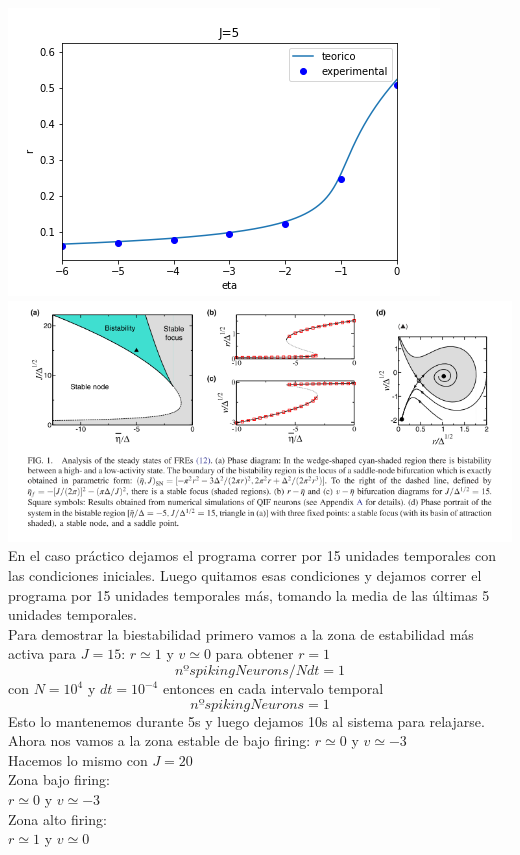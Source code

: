 \documentclass[a4paper]{article}
\begin{document}
\includegraphics[scale=0.7]{r_vs_eta_J5.png}\\
\includegraphics[scale=0.4]{diagramaspaper.png}\\

En el caso práctico dejamos el programa correr por 15 unidades temporales con las condiciones iniciales. Luego quitamos esas condiciones y dejamos correr el programa por 15 unidades temporales más, tomando la media de las últimas 5 unidades temporales.\\
Para demostrar la biestabilidad primero vamos a la zona de estabilidad más activa para $ J = 15$:
$r\simeq 1$ y $ v\simeq 0$
para obtener  $r = 1$
$$nºspikingNeurons/Ndt = 1$$
con $N = 10^4$ y $dt = 10^{-4}$
entonces en cada intervalo temporal
$$nºspikingNeurons = 1$$
Esto lo mantenemos durante 5s y luego dejamos 10s al sistema para relajarse.
Ahora nos vamos a la zona estable de bajo firing:
$r\simeq 0$ y $ v\simeq -3$\\

Hacemos lo mismo con $J = 20$\\
Zona bajo firing:\\
$r\simeq 0$ y $ v\simeq -3$\\
Zona alto firing:\\
$r\simeq 1$ y $ v\simeq 0$\\
\end{document}
